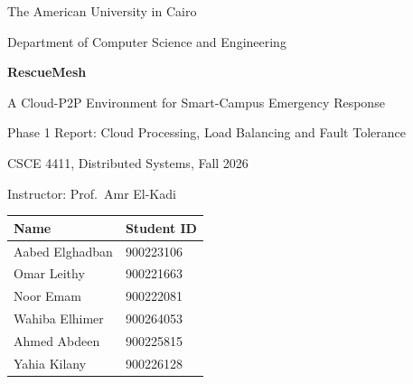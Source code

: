 \documentclass[10pt,a4paper]{article}
\begin{document}
\begin{titlepage}
  \centering
  \vspace*{0.2cm}
  {\large The American University in Cairo\par}
  {\normalsize Department of Computer Science and Engineering\par}
  \vspace{1.1cm}
  {\Huge\bfseries RescueMesh\par}
  \vspace{0.3cm}
  {\Large A Cloud-P2P Environment for Smart-Campus Emergency Response\par}
  \vspace{0.4cm}
  {\Large Phase 1 Report: Cloud Processing, Load Balancing and Fault Tolerance\par}
  \vspace{0.8cm}
  {\large CSCE 4411, Distributed Systems, Fall 2026\par}
  {\large Instructor: Prof.\ Amr El-Kadi\par}
  \vspace{0.8cm}
  \begin{tabular}{@{}ll@{}}
    \toprule
    Name & Student ID \\
    \midrule
    Aabed Elghadban & 900223106 \\
    Omar Leithy & 900221663 \\
    Noor Emam & 900222081 \\
    Wahiba Elhimer & 900264053 \\
    Ahmed Abdeen & 900225815 \\
    Yahia Kilany & 900226128 \\
    \bottomrule
  \end{tabular}
  \vspace{1.0cm}


\end{titlepage}
\end{document}
